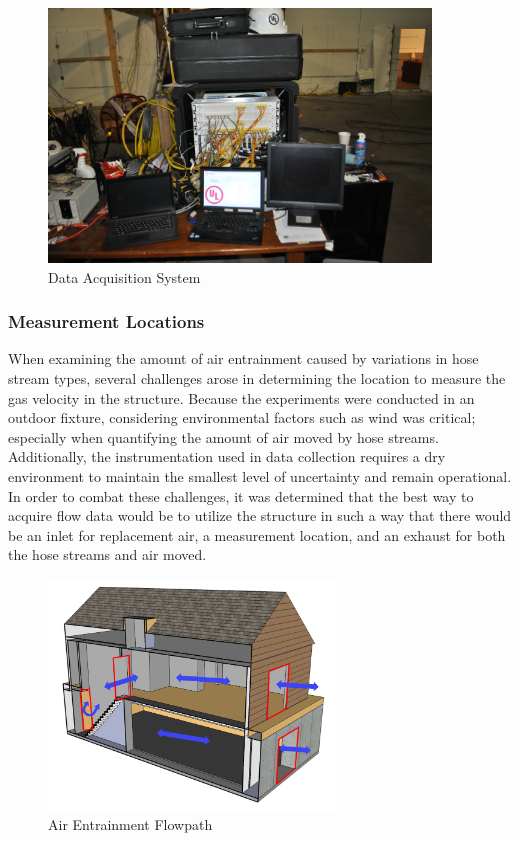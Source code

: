 \documentclass{article}
\begin{document}
\begin{figure}[H]
	\centering
	\includegraphics[width = 4in]{Figures/Instrumentation/DataSystem.jpg}
	\caption{Data Acquisition System}
	\label{fig:DataSystem}
\end{figure}

\clearpage

\subsubsection{Measurement Locations}

When examining the amount of air entrainment caused by variations in hose stream types, several challenges arose in determining the location to measure the gas velocity in the structure. Because the experiments were conducted in an outdoor fixture, considering environmental factors such as wind was critical; especially when quantifying the amount of air moved by hose streams. Additionally, the instrumentation used in data collection requires a dry environment to maintain the smallest level of uncertainty and remain operational. In order to combat these challenges, it was determined that the best way to acquire flow data would be to utilize the structure in such a way that there would be an inlet for replacement air, a measurement location, and an exhaust for both the hose streams and air moved. 

\begin{figure}[!ht]
	\centering
	\includegraphics[width=3in]{Figures/Air_Entrainment/Airflow_flowpath}
	\caption{Air Entrainment Flowpath}
	\label{fig:Air_Entrainment_Flowpath}
\end{figure}
\end{document}
